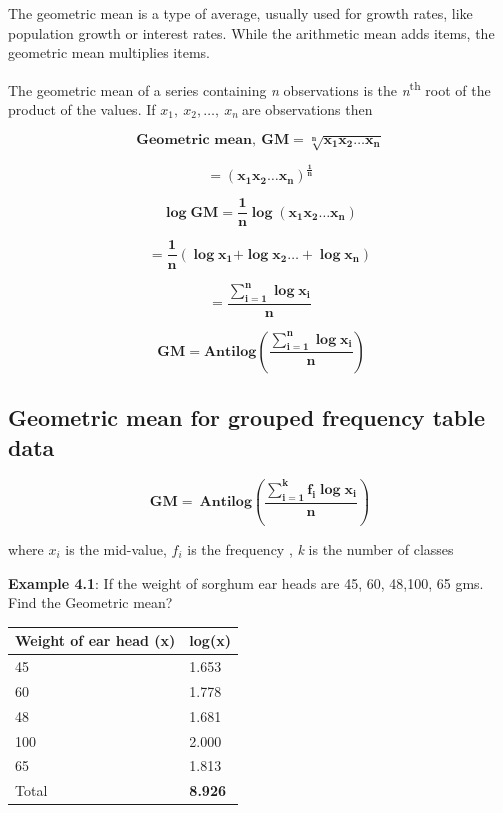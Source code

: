 \documentclass[
]{book}
\begin{document}
The geometric mean is a type of average, usually used for growth rates,
like population growth or interest rates. While the arithmetic mean adds
items, the geometric mean multiplies items.

The geometric mean of a series containing \emph{n} observations is the
\emph{n}\textsuperscript{th} root of the product of the values. If
\(x_{1},\ x_{2},\ldots,\ x_{n}\ \)are observations then

\[\mathbf{\text{Geometric mean}}\mathbf{,\ }\mathbf{GM =}\sqrt[\mathbf{n}]{\mathbf{x}_{\mathbf{1}}\mathbf{x}_{\mathbf{2}}\mathbf{\ldots}\mathbf{x}_{\mathbf{n}}}\]

\[\mathbf{=}\left( \mathbf{x}_{\mathbf{1}}\mathbf{x}_{\mathbf{2}}\mathbf{\ldots}\mathbf{x}_{\mathbf{n}} \right)^{\frac{\mathbf{1}}{\mathbf{n}}}\]

\[\mathbf{\log}\mathbf{\text{GM}}\mathbf{=}\frac{\mathbf{1}}{\mathbf{n}}\mathbf{\log}\left( \mathbf{x}_{\mathbf{1}}\mathbf{x}_{\mathbf{2}}\mathbf{\ldots}\mathbf{x}_{\mathbf{n}} \right)\]

\[\mathbf{=}\frac{\mathbf{1}}{\mathbf{n}}\left( \mathbf{\log}\mathbf{x}_{\mathbf{1}}\mathbf{+}\mathbf{\log}\mathbf{x}_{\mathbf{2}}\mathbf{\ldots +}\mathbf{\log}\mathbf{x}_{\mathbf{n}} \right)\]

\[\mathbf{=}\frac{\sum_{\mathbf{i = 1}}^{\mathbf{n}}{\mathbf{\log}\mathbf{x}_{\mathbf{i}}}}{\mathbf{n}}\]

\[\mathbf{\ GM = Antilog}\left( \frac{\sum_{\mathbf{i = 1}}^{\mathbf{n}}{\mathbf{\log}\mathbf{x}_{\mathbf{i}}}}{\mathbf{n}} \right)\]

\hypertarget{geometric-mean-for-grouped-frequency-table-data}{%
\subsection{Geometric mean for grouped frequency table data}\label{geometric-mean-for-grouped-frequency-table-data}}

\[\mathbf{GM = \ Antilog}\left( \frac{\sum_{\mathbf{i = 1}}^{\mathbf{k}}{{\mathbf{f}_{\mathbf{i}}\mathbf{\log}}\mathbf{x}_{\mathbf{i}}}}{\mathbf{n}} \right)\]

where \(x_{i}\) is the mid-value, \(f_{i}\) is the frequency , \emph{k} is the
number of classes

\textbf{Example 4.1}: If the weight of sorghum ear heads are 45, 60, 48,100,
65 gms. Find the Geometric mean?

\begin{longtable}[]{@{}ll@{}}
\toprule
Weight of ear head (x) & log(x) \\
\midrule
\endhead
45 & 1.653 \\
60 & 1.778 \\
48 & 1.681 \\
100 & 2.000 \\
65 & 1.813 \\
Total & \textbf{8.926} \\
\bottomrule
\end{longtable}
\end{document}
